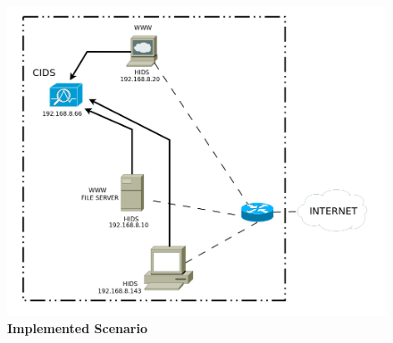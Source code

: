 \documentclass[conference]{IEEEtran}
\begin{document}
\begin{figure}[h!]
\caption{\textbf{Implemented Scenario}}
\label{impscen}
\centering
\includegraphics[scale=0.12]{framework-v5} 
\end{figure}
\end{document}
